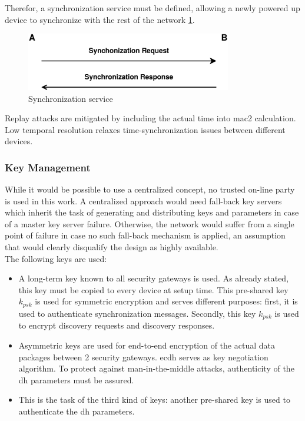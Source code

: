 Therefor, a synchronization service must be defined, allowing a newly powered up device to synchronize with the rest of the network \ref{fig:syncProt}.
\begin{figure}
  \centering
    \includegraphics[width=0.8\textwidth]{figures/protSync.eps}
 \caption{Synchronization service}
 \label{fig:syncProt}
\end{figure}
Replay attacks are mitigated by including the actual time into \gls{mac2} calculation. Low temporal resolution relaxes time-synchronization issues between
different devices.

\subsubsection{Key Management}

While it would be possible to use a centralized concept, no trusted on-line party is used in this work. A centralized approach would need fall-back key servers
which inherit the task of generating and distributing keys and parameters in case of a master key server failure. Otherwise, the network would suffer from a
single point of failure in case no such fall-back mechanism is applied, an assumption that would clearly disqualify the design as highly available.
\\
The following keys are used:

\begin{itemize}
 \item A long-term key known to all security gateways is used. As already stated, this key must be copied to every device at setup time. 
This pre-shared key $k_{psk}$ is used for symmetric encryption and serves different purposes: first, it is used to authenticate synchronization messages.
Secondly, this key $k_{psk}$ is used to encrypt discovery requests and discovery responses.
 \item Asymmetric keys are used for end-to-end encryption of the actual data packages between 2 security gateways. \gls{ecdh} serves as key negotiation algorithm.
 To protect against man-in-the-middle attacks, authenticity of the \gls{dh} parameters must be assured.
 \item This is the task of the third kind of keys: another pre-shared key is used to authenticate the \gls{dh} parameters.
\end{itemize}


